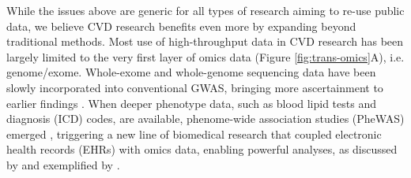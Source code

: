 \documentclass[letter]{bioinfo}
\begin{document}
	While the issues above are generic for all types of research aiming to re-use public data, we believe CVD research benefits even more by expanding beyond traditional methods. Most use of high-throughput data in CVD research has been largely limited to the very first layer of omics data (Figure \ref{fig:trans-omics}A), i.e. genome/exome. Whole-exome and whole-genome sequencing data have been slowly incorporated into conventional GWAS, bringing more ascertainment to earlier findings \citep{Cohen:2006:Sequence,Dewey:2016:Inactivating,CARDIoGRAM:2016:Coding,NHLBI:2014:LossofFunction}. When deeper phenotype data, such as blood lipid tests and diagnosis (ICD) codes, are available, phenome-wide association studies (PheWAS) emerged \citep{Denny:2013:Systematic}, triggering a new line of biomedical research that coupled electronic health records (EHRs) with omics data, enabling powerful analyses, as discussed by  \cite{Denaxas:2015:Big, Wu:2017:Omic} and exemplified by \cite{Dewey:2016:Distribution,Li:2018:Decoding}. 
\end{document}
